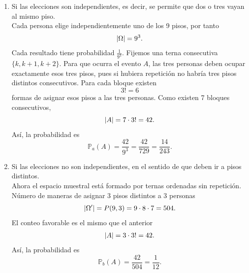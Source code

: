 \message{ !name(tarea2.tex)}\documentclass[12pt,a4paper]{article}
\begin{document}
    \begin{solucion}
        \begin{enumerate}
            \item[(a)] Si las elecciones son independientes, es decir, se permite que dos o tres vayan al mismo piso.\\
            Cada persona elige independientemente uno de los 9 pisos, por tanto
            \begin{equation*}
                \abs{\Omega}=9^{3}.
            \end{equation*}
            Cada resultado tiene probabilidad $\frac{1}{9^{3}}$. Fijemos una terna consecutiva $\{k,k+1,k+2\}$.
            Para que ocurra el evento $A$, las tres personas deben ocupar exactamente esos tres pisos, pues si
            hubiera repetición no habría tres pisos distintos consecutivos. Para cada bloque existen
            \begin{equation*}
                3!=6
            \end{equation*}
            formas de asignar esos pisos a las tres personas. Como existen 7 bloques consecutivos,
            \begin{equation*}
                \abs{A}=7\cdot3!=42.
            \end{equation*}
            Así, la probabilidad es
            \begin{equation*}
                \mathbb{P}_{a}(A)=\frac{42}{9^{3}}=\frac{42}{729}=\frac{14}{243}.
            \end{equation*}
            \item[(b)] Si las elecciones no son independientes, en el sentido de que deben ir a pisos distintos.\\
            Ahora el espacio muestral está formado por ternas ordenadas sin repetición. Número de maneras
            de asignar 3 pisos distintos a 3 personas
            \begin{equation*}
                \abs{\Omega^{\prime}}=P(9,3)=9\cdot8\cdot7=504.
            \end{equation*}
            El conteo favorable es el mismo que el anterior
            \begin{align*}
                \abs{A}=3\cdot3!=42.
            \end{align*}
            Así, la probabilidad es
            \begin{equation*}
                \mathbb{P}_{b}(A)=\frac{42}{504}=\frac{1}{12}.
            \end{equation*}
        \end{enumerate}
    \end{solucion}
\end{document}
